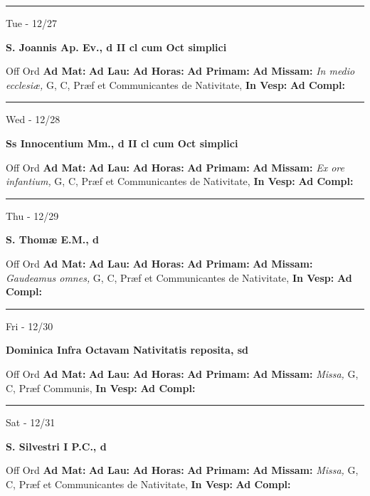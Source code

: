 \documentclass[letterpaper, 10pt]{article}
\begin{document}
\hrule
\begin{center}
Tue - 12/27
\end{center}\textbf{ \large S. Joannis Ap. Ev., \textnormal{\normalsize d II cl cum Oct simplici}}
\begin{justify}
Off Ord
\textbf{Ad Mat: }
\textbf{Ad Lau: }
\textbf{Ad Horas: }
\textbf{Ad Primam: }
\textbf{Ad Missam:} \textit{In medio ecclesiæ, } G, C, Præf et Communicantes de Nativitate, 
\textbf{In Vesp: }
\textbf{Ad Compl: }\end{justify}



\hrule
\begin{center}
Wed - 12/28
\end{center}\textbf{ \large Ss Innocentium Mm., \textnormal{\normalsize d II cl cum Oct simplici}}
\begin{justify}
Off Ord
\textbf{Ad Mat: }
\textbf{Ad Lau: }
\textbf{Ad Horas: }
\textbf{Ad Primam: }
\textbf{Ad Missam:} \textit{Ex ore infantium, } G, C, Præf et Communicantes de Nativitate, 
\textbf{In Vesp: }
\textbf{Ad Compl: }\end{justify}



\hrule
\begin{center}
Thu - 12/29
\end{center}\textbf{ \large S. Thomæ E.M., \textnormal{\normalsize d}}
\begin{justify}
Off Ord
\textbf{Ad Mat: }
\textbf{Ad Lau: }
\textbf{Ad Horas: }
\textbf{Ad Primam: }
\textbf{Ad Missam:} \textit{Gaudeamus omnes, } G, C, Præf et Communicantes de Nativitate, 
\textbf{In Vesp: }
\textbf{Ad Compl: }\end{justify}



\hrule
\begin{center}
Fri - 12/30
\end{center}\textbf{ \large Dominica Infra Octavam Nativitatis reposita, \textnormal{\normalsize sd}}
\begin{justify}
Off Ord
\textbf{Ad Mat: }
\textbf{Ad Lau: }
\textbf{Ad Horas: }
\textbf{Ad Primam: }
\textbf{Ad Missam:} \textit{Missa, } G, C, Præf Communis, 
\textbf{In Vesp: }
\textbf{Ad Compl: }\end{justify}



\hrule
\begin{center}
Sat - 12/31
\end{center}\textbf{ \large S. Silvestri I P.C., \textnormal{\normalsize d}}
\begin{justify}
Off Ord
\textbf{Ad Mat: }
\textbf{Ad Lau: }
\textbf{Ad Horas: }
\textbf{Ad Primam: }
\textbf{Ad Missam:} \textit{Missa, } G, C, Præf et Communicantes de Nativitate, 
\textbf{In Vesp: }
\textbf{Ad Compl: }\end{justify}
\end{document}
